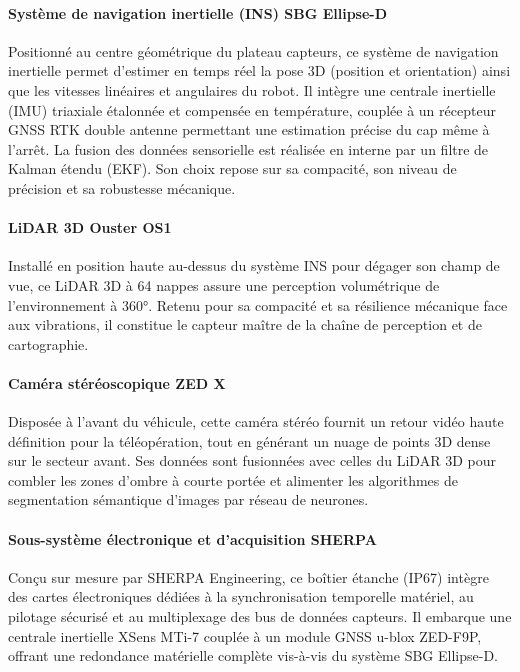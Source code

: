 \paragraph{Système de navigation inertielle (INS) SBG Ellipse-D}
Positionné au centre géométrique du plateau capteurs, ce système de navigation inertielle permet d'estimer en temps réel la pose 3D (position et orientation) ainsi que les vitesses linéaires et angulaires du robot. Il intègre une centrale inertielle (IMU) triaxiale étalonnée et compensée en température, couplée à un récepteur GNSS RTK double antenne permettant une estimation précise du cap même à l'arrêt. La fusion des données sensorielle est réalisée en interne par un filtre de Kalman étendu (EKF). Son choix repose sur sa compacité, son niveau de précision et sa robustesse mécanique.

\paragraph{LiDAR 3D Ouster OS1}
Installé en position haute au-dessus du système INS pour dégager son champ de vue, ce LiDAR 3D à 64 nappes assure une perception volumétrique de l'environnement à 360°. Retenu pour sa compacité et sa résilience mécanique face aux vibrations, il constitue le capteur maître de la chaîne de perception et de cartographie.

\paragraph{Caméra stéréoscopique ZED X}
Disposée à l'avant du véhicule, cette caméra stéréo fournit un retour vidéo haute définition pour la téléopération, tout en générant un nuage de points 3D dense sur le secteur avant. Ses données sont fusionnées avec celles du LiDAR 3D pour combler les zones d'ombre à courte portée et alimenter les algorithmes de segmentation sémantique d'images par réseau de neurones.

\paragraph{Sous-système électronique et d'acquisition SHERPA}
Conçu sur mesure par SHERPA Engineering, ce boîtier étanche (IP67) intègre des cartes électroniques dédiées à la synchronisation temporelle matériel, au pilotage sécurisé et au multiplexage des bus de données capteurs. Il embarque une centrale inertielle XSens MTi-7 couplée à un module GNSS u-blox ZED-F9P, offrant une redondance matérielle complète vis-à-vis du système SBG Ellipse-D.

